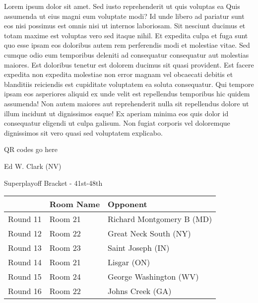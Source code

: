 \documentclass{article}%
\begin{document}
\vspace*{8pt}%
\linebreak%
\newline%
\newline%
    Lorem ipsum dolor sit amet. Sed iusto reprehenderit ut quis voluptas ea Quis assumenda ut eius magni eum voluptate modi? Id unde libero ad pariatur sunt eos nisi possimus est omnis nisi ut internos laboriosam. Sit nesciunt ducimus et totam maxime est voluptas vero sed itaque nihil. Et expedita culpa et fuga sunt quo esse ipsam eos doloribus autem rem perferendis modi et molestiae vitae.\newline%
\newline%
    Sed cumque odio eum temporibus deleniti ad consequatur consequatur aut molestias maiores. Est doloribus tenetur est dolorem ducimus sit quasi provident. Est facere expedita non expedita molestiae non error magnam vel obcaecati debitis et blanditiis reiciendis est cupiditate voluptatem ea soluta consequatur. Qui tempore ipsam eos asperiores aliquid ex unde velit est repellendus temporibus hic quidem assumenda!\newline%
\newline%
    Non autem maiores aut reprehenderit nulla sit repellendus dolore ut illum incidunt ut dignissimos eaque! Ex aperiam minima eos quis dolor id consequatur eligendi ut culpa galisum. Non fugiat corporis vel doloremque dignissimos sit vero quasi sed voluptatem explicabo.\newline%
\newline%
\vspace*{30pt}%
\begin{center}%
\begin{Huge}%
QR codes go here%
\end{Huge}%
\end{center}%
\newpage%
\begin{center}%
\begin{Huge}%
Ed W. Clark (NV)%
\end{Huge}%
\vspace*{8pt}%
\linebreak%
\begin{Large}%
Superplayoff Bracket {-} 41st{-}48th%
\end{Large}%
\end{center}%
%
\begin{tabularx}{\textwidth}{|c|Y|Y|}%
\hline%
&Room Name&Opponent\\%
\hline%
Round 11&Room 21&Richard Montgomery B (MD)\\%
Round 12&Room 22&Great Neck South (NY)\\%
Round 13&Room 23&Saint Joseph (IN)\\%
Round 14&Room 21&Lisgar (ON)\\%
Round 15&Room 24&George Washington (WV)\\%
Round 16&Room 22&Johns Creek (GA)\\%
\hline%
\end{tabularx}%
\end{document}

